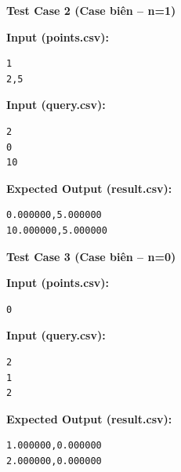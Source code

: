 \vspace{0.5cm}

\textbf{Test Case 2 (Case biên -- n=1)}

\textbf{Input (points.csv):}

\begin{lstlisting}
1
2,5
\end{lstlisting}

\textbf{Input (query.csv):}

\begin{lstlisting}
2
0
10
\end{lstlisting}

\textbf{Expected Output (result.csv):}

\begin{lstlisting}
0.000000,5.000000
10.000000,5.000000
\end{lstlisting}

\vspace{0.5cm}

\textbf{Test Case 3 (Case biên -- n=0)}

\textbf{Input (points.csv):}

\begin{lstlisting}
0
\end{lstlisting}

\textbf{Input (query.csv):}

\begin{lstlisting}
2
1
2
\end{lstlisting}

\textbf{Expected Output (result.csv):}

\begin{lstlisting}
1.000000,0.000000
2.000000,0.000000
\end{lstlisting}